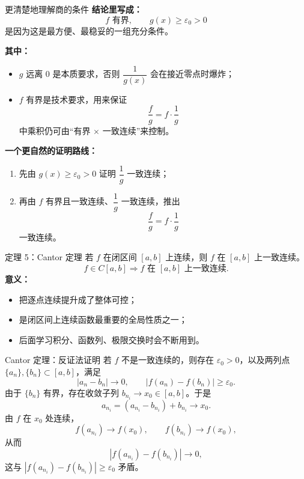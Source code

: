 ﻿\documentclass[aspectratio=169,11pt]{ctexbeamer}
\begin{document}
\begin{frame}[allowframebreaks]{更清楚地理解商的条件}
\textbf{结论里写成：}
\[
  f \text{ 有界},\qquad g(x)\ge \varepsilon_0>0
\]
是因为这是最方便、最稳妥的一组充分条件。
\vspace{0.6em}

\textbf{其中：}
\begin{itemize}
  \item $g$ 远离 $0$ 是本质要求，否则 $\dfrac1{g(x)}$ 会在接近零点时爆炸；
  \item $f$ 有界是技术要求，用来保证
  \[
    \frac{f}{g}=f\cdot \frac1g
  \]
  中乘积仍可由“有界 $\times$ 一致连续”来控制。
\end{itemize}
\vspace{0.6em}

\textbf{一个更自然的证明路线：}
\begin{enumerate}
  \item 先由 $g(x)\ge \varepsilon_0>0$ 证明 $\dfrac1g$ 一致连续；
  \item 再由 $f$ 有界且一致连续、$\dfrac1g$ 一致连续，推出
  \[
    \frac{f}{g}=f\cdot \frac1g
  \]
  一致连续。
\end{enumerate}
\end{frame}

\begin{frame}{定理 5：Cantor 定理}
若 $f$ 在闭区间 $[a,b]$ 上连续，则 $f$ 在 $[a,b]$ 上一致连续。
\[
  f\in C[a,b]\Longrightarrow f \text{ 在 }[a,b]\text{ 上一致连续}.
\]
\vspace{0.7em}
\textbf{意义：}
\begin{itemize}
  \item 把逐点连续提升成了整体可控；
  \item 是闭区间上连续函数最重要的全局性质之一；
  \item 后面学习积分、函数列、极限交换时会不断用到。
\end{itemize}
\end{frame}

\begin{frame}{Cantor 定理：反证法证明}
若 $f$ 不是一致连续的，则存在 $\varepsilon_0>0$，以及两列点 $\{a_n\},\{b_n\}\subset[a,b]$，满足
\[
  |a_n-b_n|\to 0,\qquad |f(a_n)-f(b_n)|\ge \varepsilon_0.
\]
由于 $\{b_n\}$ 有界，存在收敛子列 $b_{n_i}\to x_0\in[a,b]$。于是
\[
  a_{n_i}=(a_{n_i}-b_{n_i})+b_{n_i}\to x_0.
\]
由 $f$ 在 $x_0$ 处连续，
\[
  f(a_{n_i})\to f(x_0),\qquad f(b_{n_i})\to f(x_0),
\]
从而
\[
  |f(a_{n_i})-f(b_{n_i})|\to 0,
\]
这与 $|f(a_{n_i})-f(b_{n_i})|\ge \varepsilon_0$ 矛盾。
\end{frame}
\end{document}
